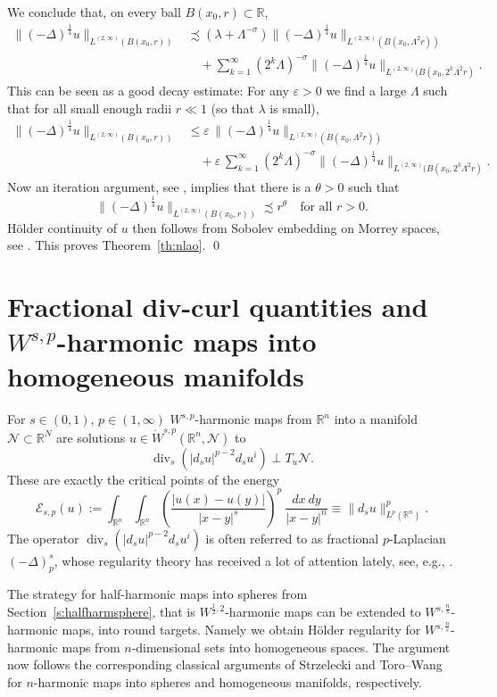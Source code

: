 \documentclass[12pt]{amsart}
\def\eps{\varepsilon}
\theoremstyle{definition}
\newcommand{\R}{\mathbb{R}}
\newcommand{\brac}[1]{\left (#1 \right )}
\numberwithin{theorem}{section} \numberwithin{equation}{section}
\renewcommand{\div}{\operatorname{div}}
\newcommand{\lap}{\Delta }
\newcommand{\aleq}{\precsim}
\newcommand{\lapv}{(-\lap)^{\frac{1}{4}}}
\begin{document}
We conclude that, on every ball $B(x_0,r) \subset \R$,
\[
\begin{split}
 \|\lapv u\|_{L^{(2,\infty)}(B(x_0,r))} &\aleq (\lambda + \Lambda^{-\sigma}) \|\lapv u\|_{L^{(2,\infty)}(B(x_0,\Lambda^2 r))} \\
 &\quad + \sum_{k=1}^\infty (2^k \Lambda)^{-\sigma} \|\lapv u\|_{L^{(2,\infty)}(B(x_0,2^k \Lambda^2 r)}.
 \end{split}
\]
This can be seen as a good decay estimate: For any $\eps > 0$ we find a large $\Lambda$ such that for all small enough radii $r \ll 1$ (so that $\lambda$ is small),
\[
\begin{split}
 \|\lapv u\|_{L^{(2,\infty)}(B(x_0,r))} &\leq \eps\, \|\lapv u\|_{L^{(2,\infty)}(B(x_0,\Lambda^2 r))} \\
 &\quad + \eps\, \sum_{k=1}^\infty (2^k \Lambda)^{-\sigma} \|\lapv u\|_{L^{(2,\infty)}(B(x_0,2^k \Lambda^2 r)}.
 \end{split}
\]
Now an iteration argument, see \cite[Lemma A.8]{Blatt-Reiter-Schikorra-2016}, implies that there is a $\theta > 0$ such that
\[
 \|\lapv u\|_{L^{(2,\infty)}(B(x_0,r))} \aleq r^\theta \quad \mbox{for all }r > 0.
\]
H\"older continuity of $u$ then follows from Sobolev embedding on Morrey spaces, see \cite{Adams-1975}. This proves Theorem~\ref{th:nlao}. \qed


\section{Fractional div-curl quantities and \texorpdfstring{$W^{s,p}$}{W(s,p)}-harmonic maps into homogeneous manifolds}\label{s:homo}
For $s \in (0,1)$, $p \in (1,\infty)$ $W^{s,p}$-harmonic maps from $\R^n$ into a manifold $\mathcal{N} \subset \R^N$ are solutions $u \in \dot{W}^{s,p}(\R^n,\mathcal{N})$ to
\[
 \div_s (|d_s u|^{p-2} d_s u^i) \perp T_u \mathcal{N}.
\]
These are exactly the critical points of the energy
\[
 \mathcal{E}_{s,p}(u) := \int_{\R^n}\int_{\R^n} \brac{\frac{|u(x)-u(y)|}{|x-y|^s}}^p\ \frac{dx\ dy}{|x-y|^{n}} \equiv \|d_s u\|_{L^p(\R^n)}^p.
\]
The operator $\div_s (|d_s u|^{p-2} d_s u^i)$ is often referred to as fractional $p$-Laplacian $(-\lap)^s_p$, whose regularity theory has received a lot of attention lately, see, e.g., \cite{DiCastro-Kuusi-Palatucci-2016,Kuusi-Mingione-Sire-2015,Brasco-Lindgren-2017,Schikorra-2016}.

The strategy for half-harmonic maps into spheres from Section~\ref{s:halfharmsphere}, that is $W^{\frac{1}{2},2}$-harmonic maps can be extended to $W^{s,\frac{n}{s}}$-harmonic maps, into round targets. Namely we obtain H\"older regularity for $W^{s,\frac{n}{s}}$-harmonic maps from $n$-dimensional sets into homogeneous spaces. 
The argument now follows the corresponding classical arguments of Strzelecki \cite{Strzelecki-1994} and Toro--Wang \cite{Toro-Wang} for $n$-harmonic maps into spheres and homogeneous manifolds, respectively.
\end{document}
